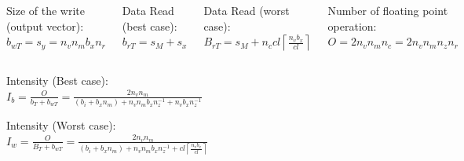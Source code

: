 \documentclass{beamer}
\newcommand{\ceil}[1]{\left\lceil#1\right\rceil}
\begin{document}
\begin{frame}
\begin{columns}
    Size of the write (output vector):\\$b_{wT} = s_y = n_v n_m b_x n_r$

    Data Read (best case):\\$b_{rT} = s_M + s_x$
    
    Data Read (worst case):\\$B_{rT} = s_M + n_c cl \ceil{\frac{n_vb_x}{cl}}$

    Number of floating point operation:\\$O = 2 n_v n_m n_c = 2 n_v n_m n_z n_r$
  \end{columns}

  \begin{center}
    Intensity (Best case):\\
    $I_b = \frac{O}{b_T+ b_{wT}} = \frac{2 n_v n_m}{ (b_i + b_x n_m) + n_v n_m b_x n_z^{-1} + n_v b_x n_z^{-1} }$
    
    Intensity (Worst case):\\
    $I_w = \frac{O}{B_T+ b_{wT}} = \frac{2 n_v n_m}{(b_i+b_x n_m) + n_v n_m b_x n_z^{-1} + cl \ceil{\frac{n_vb_x}{cl}} }$
  \end{center}
\end{frame}
\end{document}
